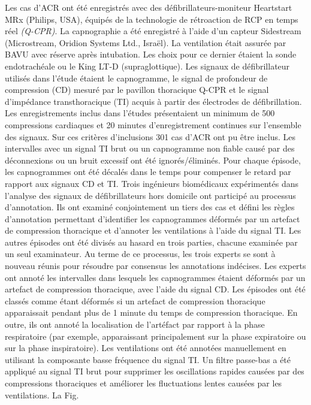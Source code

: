 \documentclass[12pt,]{article}
\begin{document}
Les cas d'ACR ont été enregistrés avec des défibrillateurs-moniteur
Heartstart MRx (Philips, USA), équipés de la technologie de rétroaction
de RCP en temps réel \emph{(Q-CPR)}. La capnographie a été enregistré à
l'aide d'un capteur Sidestream (Microstream, Oridion Systems Ltd.,
Israël). La ventilation était assurée par BAVU avec réserve après
intubation. Les choix pour ce dernier étaient la sonde endotrachéale ou
le King LT-D (supraglottique). Les signaux de défibrillateur utilisés
dans l'étude étaient le capnogramme, le signal de profondeur de
compression (CD) mesuré par le pavillon thoracique Q-CPR et le signal
d'impédance transthoracique (TI) acquis à partir des électrodes de
défibrillation. Les enregistrements inclus dans l'études présentaient un
minimum de 500 compressions cardiaques et 20 minutes d'enregistrement
continues sur l'ensemble des signaux. Sur ces critères d'inclusions 301
cas d'ACR ont pu être inclus. Les intervalles avec un signal TI brut ou
un capnogramme non fiable causé par des déconnexions ou un bruit
excessif ont été ignorés/éliminés. Pour chaque épisode, les capnogrammes
ont été décalés dans le temps pour compenser le retard par rapport aux
signaux CD et TI. Trois ingénieurs biomédicaux expérimentés dans
l'analyse des signaux de défibrillateurs hors domicile ont participé au
processus d'annotation. Ils ont examiné conjointement un tiers des cas
et défini les règles d'annotation permettant d'identifier les
capnogrammes déformés par un artefact de compression thoracique et
d'annoter les ventilations à l'aide du signal TI. Les autres épisodes
ont été divisés au hasard en trois parties, chacune examinée par un seul
examinateur. Au terme de ce processus, les trois experts se sont à
nouveau réunis pour résoudre par consensus les annotations indécises.
Les experts ont annoté les intervalles dans lesquels les capnogrammes
étaient déformés par un artefact de compression thoracique, avec l'aide
du signal CD. Les épisodes ont été classés comme étant déformés si un
artefact de compression thoracique apparaissait pendant plus de 1 minute
du temps de compression thoracique. En outre, ils ont annoté la
localisation de l'artéfact par rapport à la phase respiratoire (par
exemple, apparaissant principalement sur la phase expiratoire ou sur la
phase inspiratoire). Les ventilations ont été annotées manuellement en
utilisant la composante basse fréquence du signal TI. Un filtre
passe-bas a été appliqué au signal TI brut pour supprimer les
oscillations rapides causées par des compressions thoraciques et
améliorer les fluctuations lentes causées par les ventilations. La Fig.
\end{document}
